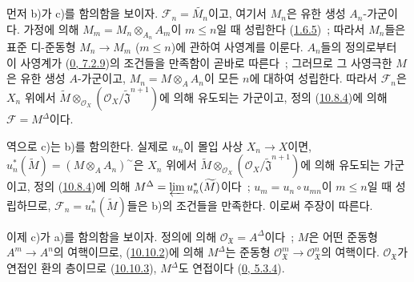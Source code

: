 먼저 b)가 c)를 함의함을 보이자. $\mathscr{F}_n=\widetilde{M_n}$이고,
여기서 $M_n$은 유한 생성 $A_n$-가군이다. 가정에 의해
$M_m=M_n\otimes_{A_n}A_m$이 $m\leq n$일 때 성립한다
(\hyperref[I.1.6.5-ko]{1.6.5})~; 따라서 $M_n$들은 표준 디-준동형
$M_n\to M_m$ ($m\leq n$)에 관하여 사영계를 이룬다. $A_n$들의
정의로부터 이 사영계가
(\hyperref[0.7.2.9-ko]{0, 7.2.9})의 조건들을 만족함이 곧바로 따른다~;
그러므로 그 사영극한 $M$은 유한 생성 $A$-가군이고,
$M_n=M\otimes_A A_n$이 모든 $n$에 대하여 성립한다. 따라서
$\mathscr{F}_n$은 $X_n$ 위에서
$\widetilde M\otimes_{\mathscr{O}_X}
(\mathscr{O}_X/\widetilde{\mathfrak{J}}^{n+1})$에 의해 유도되는
가군이고, 정의 (\hyperref[I.10.8.4-ko]{10.8.4})에 의해
$\mathscr{F}=M^\Delta$이다.

역으로 c)는 b)를 함의한다. 실제로 $u_n$이 몰입 사상 $X_n\to X$이면,
$u_n^*(\widetilde M)=(M\otimes_A A_n)^{\sim}$은 $X_n$ 위에서
$\widetilde M\otimes_{\mathscr{O}_X}
(\mathscr{O}_X/\widetilde{\mathfrak{J}}^{n+1})$에 의해 유도되는
가군이고, 정의 (\hyperref[I.10.8.4-ko]{10.8.4})에 의해
$M^\Delta=\varprojlim u_n^*(\widetilde M)$이다~;
$u_m=u_n\circ u_{mn}$이 $m\leq n$일 때 성립하므로,
$\mathscr{F}_n=u_n^*(\widetilde M)$들은 b)의 조건들을 만족한다. 이로써
주장이 따른다.

이제 c)가 a)를 함의함을 보이자. 정의에 의해
$\mathscr{O}_{\mathfrak{X}}=A^\Delta$이다~; $M$은 어떤 준동형
$A^m\to A^n$의 여핵이므로, (\hyperref[I.10.10.2-ko]{10.10.2})에 의해
$M^\Delta$는 준동형
$\mathscr{O}_{\mathfrak{X}}^m\to\mathscr{O}_{\mathfrak{X}}^n$의
여핵이다. $\mathscr{O}_{\mathfrak{X}}$가 연접인 환의 층이므로
(\hyperref[I.10.10.3-ko]{10.10.3}), $M^\Delta$도 연접이다
(\hyperref[0.5.3.4-ko]{0, 5.3.4}).

